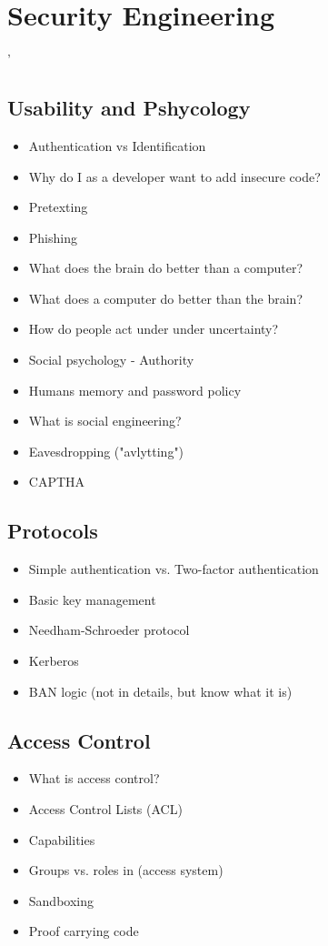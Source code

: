 \chapter{Security Engineering}'

\section{Usability and Pshycology}

	\begin{itemize}
		\item Authentication vs Identification
		\item Why do I as a developer want to add insecure code?
		\item Pretexting
		\item Phishing
		\item What does the brain do better than a computer?
		\item What does a computer do better than the brain?
		\item How do people act under under uncertainty?
		\item Social psychology - Authority
		\item Humans memory and password policy
		\item What is social engineering?
		\item Eavesdropping ("avlytting")
		\item CAPTHA
	\end{itemize}

\section{Protocols}
	\begin{itemize}
		\item Simple authentication vs. Two-factor authentication
		\item Basic key management
		\item Needham-Schroeder protocol
		\item Kerberos
		\item BAN logic (not in details, but know what it is)
	\end{itemize}

\section{Access Control}
	\begin{itemize}
		\item What is access control?
		\item Access Control Lists (ACL)
		\item Capabilities
		\item Groups vs. roles in (access system)
		\item Sandboxing
		\item Proof carrying code
	\end{itemize}

